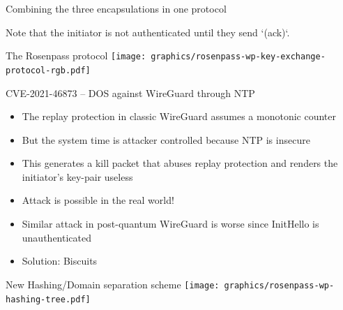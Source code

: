 \begin{frame}{Combining the three encapsulations in one protocol}


  Note that the initiator is not authenticated until they send `(ack)`.

\end{frame}

\begin{frame}{The Rosenpass protocol}
  \texttt{[image: graphics/rosenpass-wp-key-exchange-protocol-rgb.pdf]}
\end{frame}

\begin{frame}{CVE-2021-46873 – DOS against WireGuard through NTP}
\begin{itemize}
  \item The replay protection in classic WireGuard assumes a monotonic counter
  \item But the system time is attacker controlled because NTP is insecure
  \item This generates a kill packet that abuses replay protection and renders the initiator's key-pair useless
  \item Attack is possible in the real world!
  \item Similar attack in post-quantum WireGuard is worse since InitHello is unauthenticated
  \item Solution: Biscuits
\end{itemize}
\end{frame}

\begin{frame}{New Hashing/Domain separation scheme}
  \texttt{[image: graphics/rosenpass-wp-hashing-tree.pdf]}
\end{frame}

